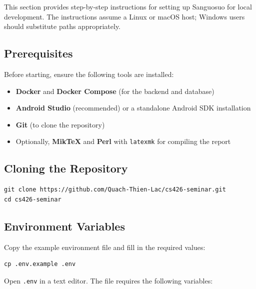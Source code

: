 This section provides step-by-step instructions for setting up Sanguosuo for local development. The instructions assume a Linux or macOS host; Windows users should substitute paths appropriately.

\subsection{Prerequisites}

Before starting, ensure the following tools are installed:

\begin{itemize}
  \item \textbf{Docker} and \textbf{Docker Compose} (for the backend and database)
  \item \textbf{Android Studio} (recommended) or a standalone Android SDK installation
  \item \textbf{Git} (to clone the repository)
  \item Optionally, \textbf{MikTeX} and \textbf{Perl} with \texttt{latexmk} for compiling the report
\end{itemize}

\subsection{Cloning the Repository}

\begin{verbatim}
git clone https://github.com/Quach-Thien-Lac/cs426-seminar.git
cd cs426-seminar
\end{verbatim}

\subsection{Environment Variables}

Copy the example environment file and fill in the required values:

\begin{verbatim}
cp .env.example .env
\end{verbatim}

Open \texttt{.env} in a text editor. The file requires the following variables:

